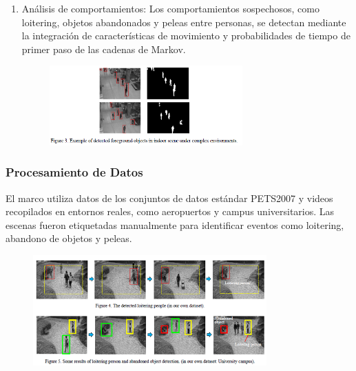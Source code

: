 \documentclass[listof=nochaptergap,12pt,times,authoryear]{report}
\begin{document}
\begin{enumerate}
    \item Análisis de comportamientos: Los comportamientos sospechosos, como loitering, objetos abandonados y peleas entre personas, se detectan mediante la integración de características de movimiento y probabilidades de tiempo de primer paso de las cadenas de Markov.

    \begin{figure}[h] %
    \centering
    \includegraphics[width=0.7\textwidth]{met8.2.png} %
    \label{fig:ejemplo} %
    \end{figure}
    
\end{enumerate}

\clearpage

\subsubsection{Procesamiento de Datos}
El marco utiliza datos de los conjuntos de datos estándar PETS2007 y videos recopilados en entornos reales, como aeropuertos y campus universitarios. Las escenas fueron etiquetadas manualmente para identificar eventos como loitering, abandono de objetos y peleas.

\begin{figure}[h] %
    \centering
    \includegraphics[width=0.8\textwidth]{pro8.png} %
    \label{fig:ejemplo} %
\end{figure}
\end{document}
